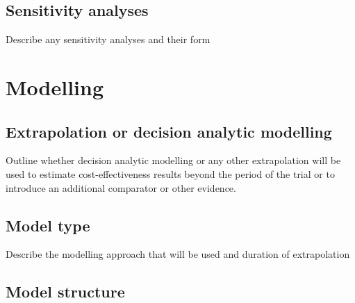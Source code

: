 \subsection{Sensitivity analyses}

Describe any sensitivity analyses and their form


\section{Modelling}

\subsection{Extrapolation or decision analytic modelling}

Outline whether decision analytic modelling or any other extrapolation
will be used to estimate cost-effectiveness results beyond the period
of the trial or to introduce an additional comparator or other
evidence.



\subsection{Model type}

Describe the modelling approach that will be used and duration of
extrapolation


\subsection{Model structure}

